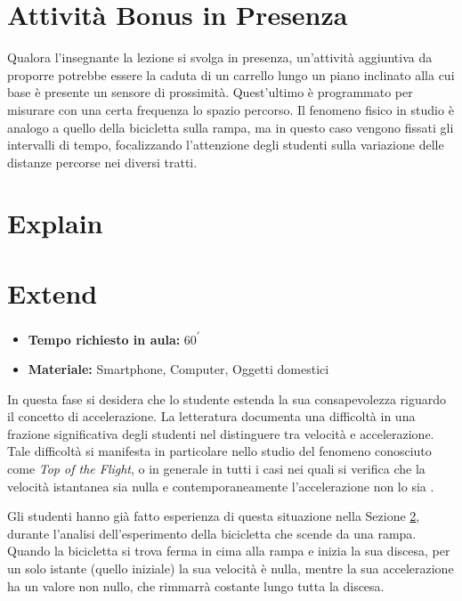 \documentclass{report} \usepackage[T1]{fontenc} \usepackage[italian]{babel}
\begin{document}
\section{Attività Bonus in Presenza}
Qualora l’insegnante la lezione si svolga in presenza, un'attività aggiuntiva da
proporre potrebbe essere la caduta di un carrello lungo un piano inclinato
alla cui base è presente un sensore di prossimità. Quest’ultimo è programmato
per misurare con una certa frequenza lo spazio percorso.
Il fenomeno fisico in studio è analogo a quello della bicicletta sulla rampa,
ma in questo caso vengono fissati gli
intervalli di tempo, focalizzando l’attenzione degli studenti sulla variazione
delle distanze percorse nei diversi tratti.

\section{Explain}\label{a_explain}

\section{Extend}
\begin{itemize}
\item \textbf{Tempo richiesto in aula:} 60\textsuperscript{$\prime$}
\item \textbf{Materiale:} Smartphone, Computer, Oggetti domestici
\end{itemize}

In questa fase si desidera che lo studente estenda la sua consapevolezza
riguardo il concetto di accelerazione. La letteratura documenta una difficoltà
in una frazione significativa degli studenti nel distinguere tra velocità
e accelerazione. Tale difficoltà si manifesta in particolare nello studio
del fenomeno conosciuto come \emph{Top of the Flight}, o in generale
in tutti i casi nei quali si verifica che la velocità istantanea sia nulla
e contemporaneamente l'accelerazione non lo sia\cite{arons1997teaching}
\cite{trowbridge1981investigation}.

Gli studenti hanno già fatto esperienza di questa situazione nella Sezione
\ref{a_explain}, durante l'analisi dell'esperimento della bicicletta che
scende da una rampa. Quando la bicicletta si trova ferma in cima alla rampa
e inizia la sua discesa, per un solo istante (quello iniziale) la sua velocità
è nulla, mentre la sua accelerazione ha un valore non nullo, che rimmarrà costante
lungo tutta la discesa.
\end{document}
